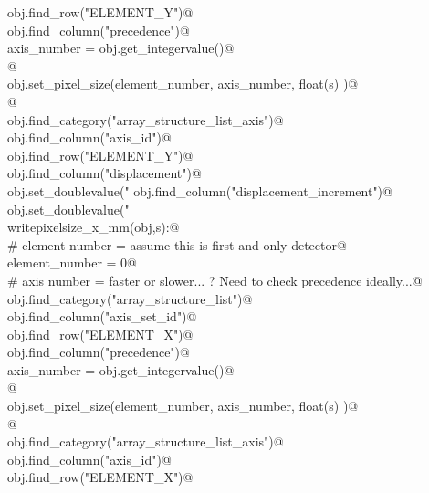 \documentclass[10pt,a4paper,twoside,notitlepage]{article}
\begin{document}
\begin{flushleft}
\begin{minipage}{\linewidth}
\begin{list}{}{}
\mbox{}\verb@    obj.find_row("ELEMENT_Y")@\\
\mbox{}\verb@    obj.find_column("precedence")@\\
\mbox{}\verb@    axis_number = obj.get_integervalue()@\\
\mbox{}\verb@    @\\
\mbox{}\verb@    obj.set_pixel_size(element_number, axis_number, float(s) )@\\
\mbox{}\verb@    @\\
\mbox{}\verb@    obj.find_category("array_structure_list_axis")@\\
\mbox{}\verb@    obj.find_column("axis_id")@\\
\mbox{}\verb@    obj.find_row("ELEMENT_Y")@\\
\mbox{}\verb@    obj.find_column("displacement")@\\
\mbox{}\verb@    obj.set_doublevalue("%.6g",float(s)/2.0)@\\
\mbox{}\verb@    obj.find_column("displacement_increment")@\\
\mbox{}\verb@    obj.set_doublevalue("%.6g",float(s))@\\
\mbox{}\verb@@\\
\mbox{}\verb@def writepixelsize_x_mm(obj,s):@\\
\mbox{}\verb@    # element number  = assume this is first and only detector@\\
\mbox{}\verb@    element_number = 0@\\
\mbox{}\verb@    # axis number = faster or slower... ? Need to check precedence ideally...@\\
\mbox{}\verb@    obj.find_category("array_structure_list")@\\
\mbox{}\verb@    obj.find_column("axis_set_id")@\\
\mbox{}\verb@    obj.find_row("ELEMENT_X")@\\
\mbox{}\verb@    obj.find_column("precedence")@\\
\mbox{}\verb@    axis_number = obj.get_integervalue()@\\
\mbox{}\verb@    @\\
\mbox{}\verb@    obj.set_pixel_size(element_number, axis_number, float(s) )@\\
\mbox{}\verb@    @\\
\mbox{}\verb@    obj.find_category("array_structure_list_axis")@\\
\mbox{}\verb@    obj.find_column("axis_id")@\\
\mbox{}\verb@    obj.find_row("ELEMENT_X")@\\

\end{list}
\end{minipage}
\end{flushleft}
\end{document}
